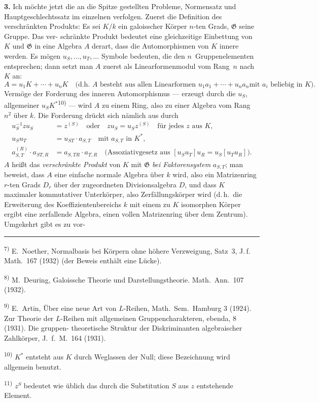 \documentclass[12pt,a4paper]{article}
\theoremstyle{plain}
\newcommand{\Ga}{\mathfrak{G}}
\begin{document}
\smallskip
\noindent\textbf{3.}\hspace{0.5em}%
Ich m\"ochte jetzt die an die Spitze gestellten Probleme, Normensatz und
Hauptgeschlechtssatz im einzelnen verfolgen. Zuerst die Definition des verschr\"ankten
Produkts: Es sei $K/k$ ein galoisscher K\"orper $n$-ten Grads, $\Ga$ seine Gruppe. Das ver-
schr\"ankte Produkt bedeutet eine gleichzeitige Einbettung von $K$ und $\Ga$ in eine
Algebra $A$ derart, dass die Automorphismen von $K$ innere werden. Es m\"ogen
$u_S,\ldots, u_T,\ldots$ Symbole bedeuten, die den $n$~Gruppenelementen entsprechen; dann
setzt man $A$ zuerst als Linearformenmodul vom Rang~$n$ nach $K$ an:
\begin{equation}\label{eq:1}
A = u_1 K + \cdots + u_n K
\quad\text{(d.h.\ $A$ besteht aus allen Linearformen $u_1 a_1 + \cdots + u_n a_n$
mit $a_i$ beliebig in $K$).}
\end{equation}
Verm\"oge der Forderung des inneren Automorphismus --- erzeugt durch die
$u_S$, allgemeiner $u_S K^*$\textsuperscript{10)} --- wird $A$ zu einem Ring, also zu einer Algebra vom Rang~$n^2$
\"uber $k$. Die Forderung dr\"uckt sich n\"amlich aus durch
\begin{align}
u_S^{-1} z u_S &= z^{(S)} \quad \text{oder} \quad z u_S = u_S z^{(S)}
\quad \text{f\"ur jedes $z$ aus $K$,} \label{eq:2} \\
u_S u_T &= u_{ST} \cdot a_{S,T} \quad \text{mit $a_{S,T}$ in $K^*$,} \label{eq:3} \\
a_{S,T}^{(R)} \cdot a_{ST,R} &= a_{S,TR} \cdot a_{T,R}
\quad \text{(Assoziativgesetz aus $[u_S u_T] u_R = u_S [u_T u_R]$).} \label{eq:4}
\end{align}
$A$ hei\ss t das \emph{verschr\"ankte Produkt} von $K$ mit $\Ga$ \emph{bei Faktorensystem} $a_{S,T}$; man
beweist, dass $A$ eine einfache normale Algebra \"uber $k$ wird, also ein Matrizenring
$r$-ten Grads $D_r$ \"uber der zugeordneten Divisionsalgebra $D$, und dass $K$ maximaler
kommutativer Unterk\"orper, also Zerf\"allungsk\"orper wird (d.\,h.\ die Erweiterung des
Koeffizientenbereichs $k$ mit einem zu $K$ isomorphen K\"orper ergibt eine zerfallende
Algebra, einen vollen Matrizenring \"uber dem Zentrum). Umgekehrt gibt es zu vor-

\bigskip
\noindent\rule{0.3\textwidth}{0.4pt}

{\small
\textsuperscript{7)} E.~Noether, Normalbasis bei K\"orpern ohne h\"ohere Verzweigung, Satz~3, J.\,f.\,Math.\ 167
(1932) (der Beweis enth\"alt eine L\"ucke).

\textsuperscript{8)} M.~Deuring, Galoissche Theorie und Darstellungstheorie. Math.\ Ann.\ 107 (1932).

\textsuperscript{9)} E.~Artin, \"Uber eine neue Art von $L$-Reihen, Math.\ Sem.\ Hamburg 3 (1924). Zur Theorie
der $L$-Reihen mit allgemeinen Gruppencharakteren, ebenda, 8 (1931). Die gruppen-
theoretische Struktur der Diskriminanten algebraischer Zahlk\"orper, J.\ f.\ M.\ 164 (1931).

\textsuperscript{10)} $K^*$ entsteht aus $K$ durch Weglassen der Null; diese Bezeichnung wird allgemein benutzt.

\textsuperscript{11)} $z^S$ bedeutet wie \"ublich das durch die Substitution $S$ aus $z$ entstehende Element.
}
\end{document}
